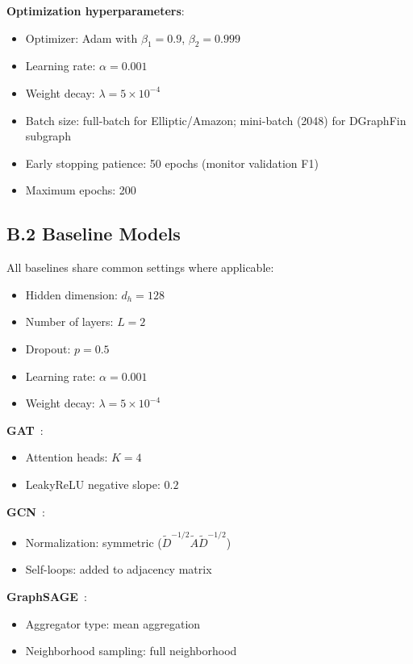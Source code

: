 \textbf{Optimization hyperparameters}:
\begin{itemize}
\item Optimizer: Adam with $\beta_1 = 0.9$, $\beta_2 = 0.999$
\item Learning rate: $\alpha = 0.001$
\item Weight decay: $\lambda = 5 \times 10^{-4}$
\item Batch size: full-batch for Elliptic/Amazon; mini-batch (2048) for DGraphFin subgraph
\item Early stopping patience: 50 epochs (monitor validation F1)
\item Maximum epochs: 200
\end{itemize}

\subsection*{B.2 Baseline Models}

All baselines share common settings where applicable:
\begin{itemize}
\item Hidden dimension: $d_h = 128$
\item Number of layers: $L = 2$
\item Dropout: $p = 0.5$
\item Learning rate: $\alpha = 0.001$
\item Weight decay: $\lambda = 5 \times 10^{-4}$
\end{itemize}

\textbf{GAT}~\cite{velivckovic2018gat}:
\begin{itemize}
\item Attention heads: $K = 4$
\item LeakyReLU negative slope: $0.2$
\end{itemize}

\textbf{GCN}~\cite{kipf2017gcn}:
\begin{itemize}
\item Normalization: symmetric ($\tilde{D}^{-1/2}\tilde{A}\tilde{D}^{-1/2}$)
\item Self-loops: added to adjacency matrix
\end{itemize}

\textbf{GraphSAGE}~\cite{hamilton2017graphsage}:
\begin{itemize}
\item Aggregator type: mean aggregation
\item Neighborhood sampling: full neighborhood
\end{itemize}

